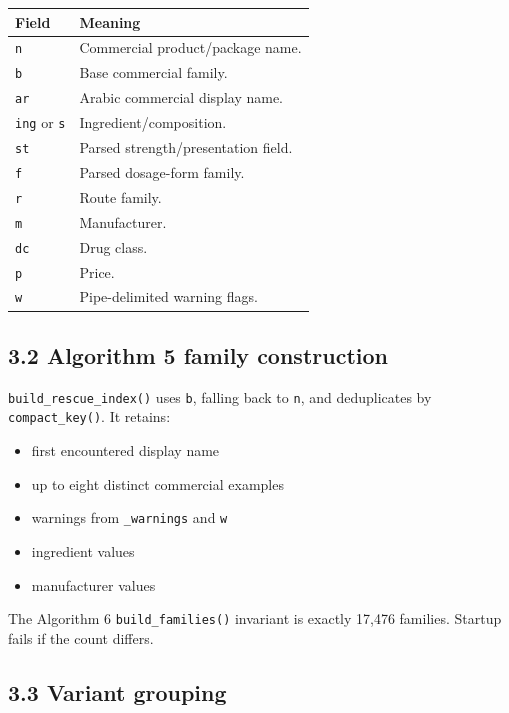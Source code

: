 {\def\LTcaptype{none} %
\begin{longtable}[]{@{}>{\RaggedRight\arraybackslash}p{.27\linewidth}>{\RaggedRight\arraybackslash}p{.66\linewidth}@{}}
\toprule\noalign{}
Field & Meaning \\
\midrule\noalign{}
\endhead
\bottomrule\noalign{}
\endlastfoot
\texttt{n} & Commercial product/package name. \\
\texttt{b} & Base commercial family. \\
\texttt{ar} & Arabic commercial display name. \\
\texttt{ing} or \texttt{s} & Ingredient/composition. \\
\texttt{st} & Parsed strength/presentation field. \\
\texttt{f} & Parsed dosage-form family. \\
\texttt{r} & Route family. \\
\texttt{m} & Manufacturer. \\
\texttt{dc} & Drug class. \\
\texttt{p} & Price. \\
\texttt{w} & Pipe-delimited warning flags. \\
\end{longtable}
}

\subsection{3.2 Algorithm 5 family construction}\label{32-algorithm-5-family-construction}

\texttt{build\_\allowbreak{}rescue\_\allowbreak{}index()} uses \texttt{b}, falling back to \texttt{n}, and deduplicates by \texttt{compact\_\allowbreak{}key()}. It retains:

\begin{itemize}
\tightlist
\item
  first encountered display name
\item
  up to eight distinct commercial examples
\item
  warnings from \texttt{\_\allowbreak{}warnings} and \texttt{w}
\item
  ingredient values
\item
  manufacturer values
\end{itemize}

The Algorithm 6 \texttt{build\_\allowbreak{}families()} invariant is exactly 17,476 families. Startup fails if the count differs.

\subsection{3.3 Variant grouping}\label{33-variant-grouping}

